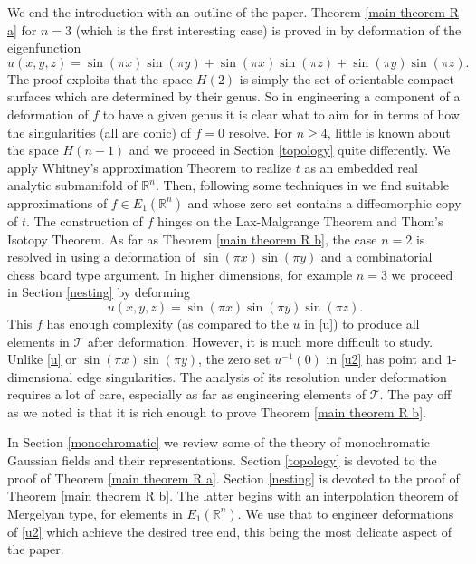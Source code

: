 \documentclass[11pt,reqno]{amsart}
\newcommand{\R}{{\mathbb R}}
\theoremstyle{definition}
\begin{document}
We end the introduction with an outline of the paper. Theorem \ref{main theorem R a}  for $n=3$ (which is the first interesting case) is proved in \cite{SW} by deformation of the eigenfunction 
\begin{equation}\label{u}
u(x,y,z)=\sin (\pi x) \sin (\pi  y) + \sin (\pi x) \sin(\pi  z) + \sin (\pi y) \sin (\pi z).
\end{equation}
The proof exploits that the space $H(2)$ is simply the set of orientable compact surfaces which are determined by their genus. So in engineering a component of  a deformation of $f$ to have a given genus it is clear what to aim for in terms of how the  singularities (all are conic) of $f=0$ resolve. For $n\geq 4$, little is known about the space $H(n-1)$ and we proceed in Section \ref{topology} quite differently. We apply Whitney's approximation Theorem to realize $t$ as an embedded real analytic submanifold of $\R^n$. Then, following some techniques in \cite{EP} we find suitable approximations of $f\in E_1(\R^n)$ and whose zero set contains a diffeomorphic copy of $t$. The construction of $f$ hinges on the Lax-Malgrange Theorem and Thom's Isotopy Theorem. As far as Theorem \ref{main theorem R b}, the case $n=2$ is resolved in \cite{SW} using a deformation of $\sin(\pi x)\sin(\pi y)$ and a combinatorial chess board type argument. In higher dimensions, for example $n=3$ we proceed in Section \ref{nesting} by deforming
\begin{equation}\label{u2}
u(x,y,z)=\sin(\pi x)\sin (\pi y)\sin (\pi z).
\end{equation}
This $f$ has enough complexity (as compared to the $u$ in \eqref{u}) to produce all elements in $\mathcal T$ after deformation. However, it is much more difficult to study. Unlike \eqref{u} or  $\sin(\pi x)\sin(\pi y)$, the zero set $u^{-1}(0)$ in \eqref{u2} has point and $1$-dimensional edge singularities.  The analysis of its resolution under deformation requires a lot of care, especially as far as engineering elements of $\mathcal T$. The pay off as we noted is that it is rich enough to prove Theorem \ref{main theorem R b}. 

In Section \ref{monochromatic} we review some of the theory of monochromatic Gaussian fields and their representations. Section \ref{topology} is devoted to the proof of Theorem \ref{main theorem R a}. Section \ref{nesting} is devoted to the proof of Theorem \ref{main theorem R b}. The latter begins with an interpolation theorem of Mergelyan type, for elements in $E_1(\R^n)$. We use that to engineer deformations of \eqref{u2} which achieve the desired tree end, this being the most delicate aspect of the paper.
\end{document}
